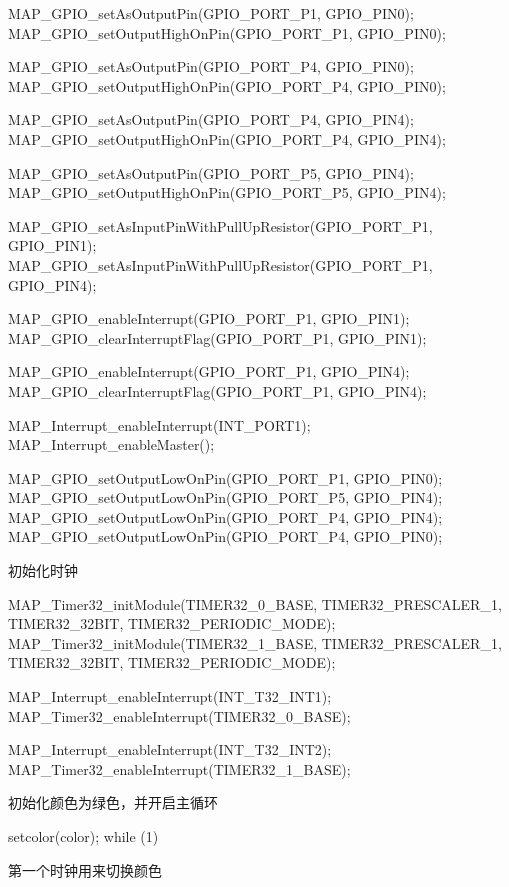 \documentclass[a4paper,10pt,UTF8]{paper}
\numberwithin{equation}{section}
\numberwithin{figure}{section}
\begin{document}
\begin{ccode}
    MAP_GPIO_setAsOutputPin(GPIO_PORT_P1, GPIO_PIN0);
    MAP_GPIO_setOutputHighOnPin(GPIO_PORT_P1, GPIO_PIN0);

    MAP_GPIO_setAsOutputPin(GPIO_PORT_P4, GPIO_PIN0);
    MAP_GPIO_setOutputHighOnPin(GPIO_PORT_P4, GPIO_PIN0);

    MAP_GPIO_setAsOutputPin(GPIO_PORT_P4, GPIO_PIN4);
    MAP_GPIO_setOutputHighOnPin(GPIO_PORT_P4, GPIO_PIN4);

    MAP_GPIO_setAsOutputPin(GPIO_PORT_P5, GPIO_PIN4);
    MAP_GPIO_setOutputHighOnPin(GPIO_PORT_P5, GPIO_PIN4);
    
    MAP_GPIO_setAsInputPinWithPullUpResistor(GPIO_PORT_P1, GPIO_PIN1);
    MAP_GPIO_setAsInputPinWithPullUpResistor(GPIO_PORT_P1, GPIO_PIN4);

    MAP_GPIO_enableInterrupt(GPIO_PORT_P1, GPIO_PIN1);
    MAP_GPIO_clearInterruptFlag(GPIO_PORT_P1, GPIO_PIN1);

    MAP_GPIO_enableInterrupt(GPIO_PORT_P1, GPIO_PIN4);
    MAP_GPIO_clearInterruptFlag(GPIO_PORT_P1, GPIO_PIN4);

    MAP_Interrupt_enableInterrupt(INT_PORT1);
    MAP_Interrupt_enableMaster();

    MAP_GPIO_setOutputLowOnPin(GPIO_PORT_P1, GPIO_PIN0);
    MAP_GPIO_setOutputLowOnPin(GPIO_PORT_P5, GPIO_PIN4);
    MAP_GPIO_setOutputLowOnPin(GPIO_PORT_P4, GPIO_PIN4);
    MAP_GPIO_setOutputLowOnPin(GPIO_PORT_P4, GPIO_PIN0);
\end{ccode}

初始化时钟

\begin{ccode}
	MAP_Timer32_initModule(TIMER32_0_BASE, TIMER32_PRESCALER_1,
	 TIMER32_32BIT, TIMER32_PERIODIC_MODE);
	MAP_Timer32_initModule(TIMER32_1_BASE, TIMER32_PRESCALER_1,
	 TIMER32_32BIT, TIMER32_PERIODIC_MODE);

    MAP_Interrupt_enableInterrupt(INT_T32_INT1);
    MAP_Timer32_enableInterrupt(TIMER32_0_BASE);

    MAP_Interrupt_enableInterrupt(INT_T32_INT2);
    MAP_Timer32_enableInterrupt(TIMER32_1_BASE);
\end{ccode}

初始化颜色为绿色，并开启主循环

\begin{ccode}
    setcolor(color);
    while (1)
    {
    }
\end{ccode}

第一个时钟用来切换颜色
\end{document}
